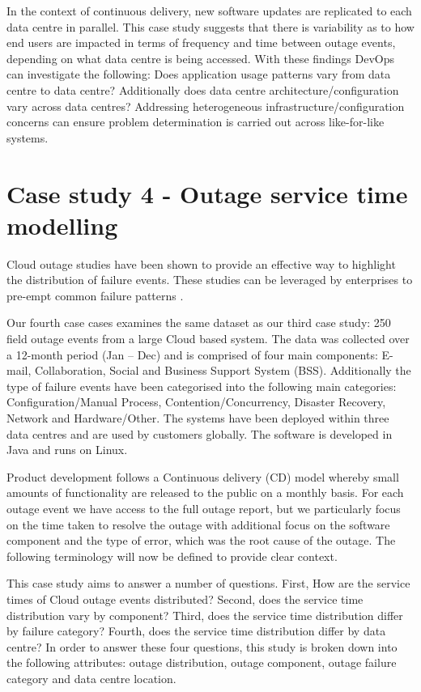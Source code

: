 In the context of continuous delivery, new software updates are replicated to each data centre in parallel. This case study suggests that there is variability as to how end users are impacted in terms of frequency and time between outage events, depending on what data centre is being accessed. With these findings DevOps can investigate the following: Does application usage patterns vary from data centre to data centre? Additionally does data centre architecture/configuration vary across data centres? Addressing heterogeneous infrastructure/configuration concerns can ensure problem determination is carried out across like-for-like systems.

\section{Case study 4 - Outage service time modelling}

Cloud outage studies have been shown to provide an effective way to highlight the distribution of failure events. These studies can be leveraged by enterprises to pre-empt common failure patterns \cite{InfoWorld2015outage} \cite{CRN2015outage}. \par

Our fourth case cases examines the same dataset as our third case study: 250 field outage events from a large Cloud based system. The data was collected over a 12-month period (Jan -- Dec) and is comprised of four main components: E-mail, Collaboration, Social and Business Support System (BSS). Additionally the type of failure events have been categorised into the following main categories: Configuration/Manual Process, Contention/Concurrency, Disaster Recovery, Network and Hardware/Other. The systems have been deployed within three data centres and are used by customers globally. The software is developed in Java and runs on Linux. \par 

Product development follows a Continuous delivery (CD) model whereby small amounts of functionality are released to the public on a monthly basis. For each outage event we have access to the full outage report, but we particularly focus on the time taken to resolve the outage with additional focus on the software component and the type of error, which was the root cause of the outage. The following terminology will now be defined to provide clear context. 

This case study aims to answer a number of questions. First, How are the service times of Cloud outage events distributed? Second, does the service time distribution vary by component? Third, does the service time distribution differ by failure category? Fourth, does the service time distribution differ by data centre? In order to answer these four questions, this study is broken down into the following attributes: outage distribution, outage component, outage failure category and  data centre location. \par

